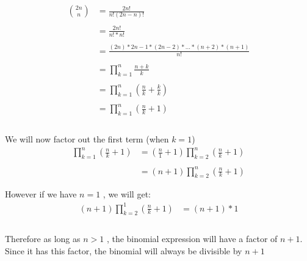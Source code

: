 \documentclass[12pt]{article}
\begin{document}
\begin{align*}
\binom{2n}{n} & = \frac{2n!}{n!(2n-n)!}\\\\
&= \frac{2n!}{n!*n!}\\\\
&= \frac{(2n)*2n-1*(2n-2)*...*(n+2)*(n+1)}{n!}\\\\
&= \prod_{k=1}^{n}\frac{n+k}{k}\\\\
&= \prod_{k=1}^{n}(\frac{n}{k}+\frac{k}{k})\\\\
&= \prod_{k=1}^{n}(\frac{n}{k}+1)\\\\
\end{align*}

We will now factor out the first term (when $k = 1$)
\begin{align*}
\prod_{k=1}^{n}(\frac{n}{k}+1) & = (\frac{n}{1} + 1) \prod_{k=2}^{n}(\frac{n}{k}+1)\\\\
&=  (n + 1) \prod_{k=2}^{n}(\frac{n}{k}+1)
\end{align*}

However if we have $n = 1$ , we will get:
\begin{align*}
(n + 1) \prod_{k=2}^{1}(\frac{n}{k}+1) & = (n+1)* 1\\\\
\end{align*}

Therefore as long as $ n > 1 $ , the binomial expression will have a factor of $n+1$. Since it has this factor, the binomial will always be divisible by $n+1$
\end{document}
